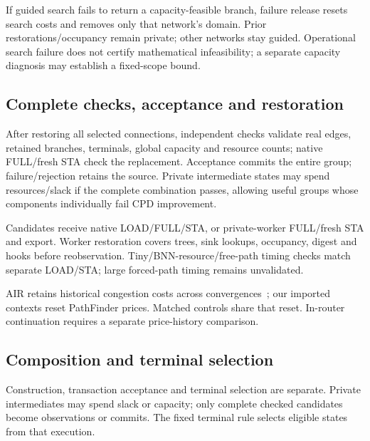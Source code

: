 \documentclass[conference,10pt]{IEEEtran}
\begin{document}
If guided search fails to return a capacity-feasible branch, failure release resets search costs and removes only that network's domain. Prior restorations/occupancy remain private; other networks stay guided. Operational search failure does not certify mathematical infeasibility; a separate capacity diagnosis may establish a fixed-scope bound.

\subsection{Complete checks, acceptance and restoration}
After restoring all selected connections, independent checks validate real edges, retained branches, terminals, global capacity and resource counts; native FULL/fresh STA check the replacement. Acceptance commits the entire group; failure/rejection retains the source. Private intermediate states may spend resources/slack if the complete combination passes, allowing useful groups whose components individually fail CPD improvement.

Candidates receive native LOAD/FULL/STA, or private-worker FULL/fresh STA and export. Worker restoration covers trees, sink lookups, occupancy, digest and hooks before reobservation. Tiny/BNN-resource/free-path timing checks match separate LOAD/STA; large forced-path timing remains unvalidated.

AIR retains historical congestion costs across convergences~\cite{air}; our imported contexts reset PathFinder prices. Matched controls share that reset. In-router continuation requires a separate price-history comparison.


\subsection{Composition and terminal selection}
Construction, transaction acceptance and terminal selection are separate. Private intermediates may spend slack or capacity; only complete checked candidates become observations or commits. The fixed terminal rule selects eligible states from that execution.
\end{document}
